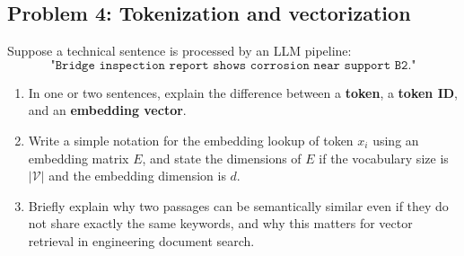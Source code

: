 \documentclass[12pt]{article}
\begin{document}
\newpage

\subsection*{Problem 4: Tokenization and vectorization}
Suppose a technical sentence is processed by an LLM pipeline:
\[
\texttt{"Bridge inspection report shows corrosion near support B2."}
\]

\begin{enumerate}
    \renewcommand{\labelenumi}{(\alph{enumi})}
    \item In one or two sentences, explain the difference between a \textbf{token}, a \textbf{token ID}, and an \textbf{embedding vector}.

    \vspace{18pt}
    \fullunderline

    \vspace{18pt}
    \fullunderline

    \item Write a simple notation for the embedding lookup of token \(x_i\) using an embedding matrix \(E\), and state the dimensions of \(E\) if the vocabulary size is \(|\mathcal{V}|\) and the embedding dimension is \(d\).

    \vspace{18pt}
    \fullunderline

    \vspace{18pt}
    \fullunderline

    \item Briefly explain why two passages can be semantically similar even if they do not share exactly the same keywords, and why this matters for vector retrieval in engineering document search.

    \vspace{18pt}
    \fullunderline

    \vspace{18pt}
    \fullunderline
\end{enumerate}
\end{document}
